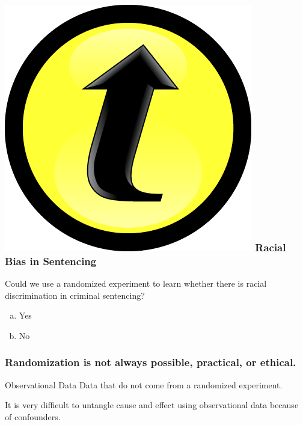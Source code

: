 \documentclass{beamer}
\begin{document}
\begin{frame}
\frametitle{\includegraphics[scale = 0.05]{./images/clicker} \hfill Racial Bias in Sentencing}
Could we use a randomized experiment to learn whether there is racial discrimination in criminal sentencing?

	\begin{enumerate}[(a)]
		\item Yes
		\item No
	\end{enumerate}
\end{frame}
\begin{frame}
\frametitle{Randomization is not always possible, practical, or ethical.}


\end{frame}





\begin{frame}

\begin{block}{Observational Data}
Data that do not come from a randomized experiment.

\end{block}
\vspace{2em}
\begin{alertblock}{It is very difficult to untangle cause and effect using observational data because of confounders.}
\end{alertblock}


\end{frame}
\end{document}
